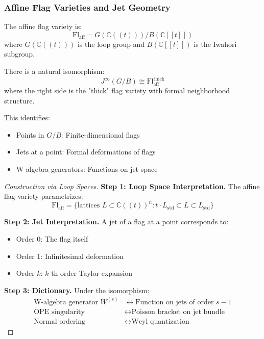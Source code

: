 \subsubsection{Affine Flag Varieties and Jet Geometry}

\begin{definition}\label{def:aff-flag}
The affine flag variety is:
\[
\mathrm{Fl}_{\mathrm{aff}} = G(\mathbb{C}((t)))/B(\mathbb{C}[[t]])
\]
where $G(\mathbb{C}((t)))$ is the loop group and $B(\mathbb{C}[[t]])$ is the Iwahori subgroup.
\end{definition}

\begin{theorem}\label{thm:jet-flag}
There is a natural isomorphism:
\[
J^{\infty}(G/B) \cong \mathrm{Fl}_{\mathrm{aff}}^{\mathrm{thick}}
\]
where the right side is the "thick" flag variety with formal neighborhood structure.

This identifies:
\begin{itemize}
\item Points in $G/B$: Finite-dimensional flags
\item Jets at a point: Formal deformations of flags
\item W-algebra generators: Functions on jet space
\end{itemize}
\end{theorem}

\begin{proof}[Construction via Loop Spaces]
\textbf{Step 1: Loop Space Interpretation.} The affine flag variety parametrizes:
\[
\mathrm{Fl}_{\mathrm{aff}} = \{\text{lattices } L \subset \mathbb{C}((t))^n : t \cdot L_{\mathrm{std}} \subset L \subset L_{\mathrm{std}}\}
\]

\textbf{Step 2: Jet Interpretation.} A jet of a flag at a point corresponds to:
\begin{itemize}
\item Order 0: The flag itself
\item Order 1: Infinitesimal deformation
\item Order $k$: $k$-th order Taylor expansion
\end{itemize}

\textbf{Step 3: Dictionary.} Under the isomorphism:
\begin{align}
\text{W-algebra generator } W^{(s)} &\leftrightarrow \text{Function on jets of order } s-1 \\
\text{OPE singularity} &\leftrightarrow \text{Poisson bracket on jet bundle} \\
\text{Normal ordering} &\leftrightarrow \text{Weyl quantization}
\end{align}
\end{proof}

